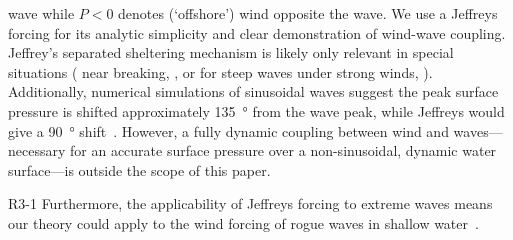 \documentclass{jfm}
\begin{document}
wave while $P<0$ denotes (`offshore') wind opposite the wave.
We use a Jeffreys forcing for its analytic simplicity and clear
demonstration of wind-wave coupling.
Jeffrey's separated sheltering mechanism is likely only relevant
in special situations (\eg{} near breaking,
\citealp{banner1976separation}, or for steep waves under strong winds,
\citealp{tian2013evolution,touboul2006interaction}).
Additionally, numerical simulations of sinusoidal waves suggest the peak
surface pressure is shifted approximately \SI{135}{\degree} from the
wave peak, while Jeffreys would give a \SI{90}{\degree}
shift~\citep{husain2019boundary}.
However, a fully dynamic coupling between wind and waves---necessary for
an accurate surface pressure over a non-sinusoidal, dynamic water
surface---is outside the scope of this paper.
\begin{LineLabel}{R3-1}
Furthermore, the applicability of Jeffreys forcing to extreme waves
means our theory could apply to the wind forcing of rogue waves in
shallow water~\citep{kharif2008influence}.
\end{LineLabel}
\end{document}
